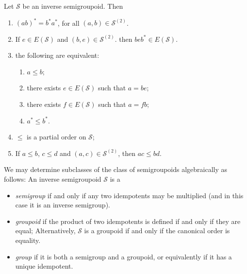 \begin{proposition}\label{prop:propertiesoperationsofinversesemigroupoid}
Let $\mathcal{S}$ be an inverse semigroupoid. Then
\begin{enumerate}[label=(\alph*)]
    \item\label{prop:propertiesoperationsofinversesemigroupoid1} $(ab)^*=b^*a^*$, for all $(a,b)\in\mathcal{S}^{(2)}$.
    \item\label{prop:propertiesoperationsofinversesemigroupoid2} If $e\in E(\mathcal{S})$ and $(b,e)\in \mathcal{S}^{(2)}$. then $beb^*\in E(\mathcal{S})$.
    \item\label{prop:propertiesoperationsofinversesemigroupoid3} the following are equivalent:
    \begin{enumerate}[label=(\alph{enumi}.\roman*)]
        \item\label{prop:propertiesoperationsofinversesemigroupoid31} $a\leq b$;
        \item\label{prop:propertiesoperationsofinversesemigroupoid32} there exists $e\in E(\mathcal{S})$ such that $a=be$;
        \item\label{prop:propertiesoperationsofinversesemigroupoid33} there exists $f\in E(\mathcal{S})$ such that $a=fb$;
        \item\label{prop:propertiesoperationsofinversesemigroupoid34} $a^*\leq b^*$.
    \end{enumerate}
    \item\label{prop:propertiesoperationsofinversesemigroupoid4} $\leq$ is a partial order on $\mathcal{S}$;
    \item\label{prop:propertiesoperationsofinversesemigroupoid5} If $a\leq b$, $c\leq d$ and $(a,c)\in \mathcal{S}^{(2)}$, then $ac\leq bd$.
\end{enumerate}
\end{proposition}

We may determine subclasses of the class of semigroupoids algebraically as follows: An inverse semigroupoid $\mathcal{S}$ is a
\begin{itemize}
    \item \emph{semigroup} if and only if any two idempotents may be multiplied (and in this case it is an inverse semigroup).
    \item \emph{groupoid} if the product of two idempotents is defined if and only if they are equal; Alternatively, $\mathcal{S}$ is a groupoid if and only if the canonical order is equality.
    \item \emph{group} if it is both a semigroup and a groupoid, or equivalently if it has a unique idempotent.
\end{itemize}